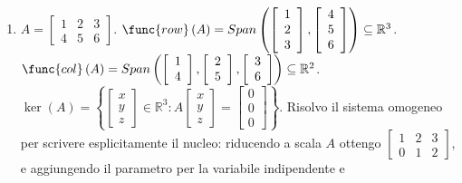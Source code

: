 \documentclass{article}
\begin{document}
\begin{enumerate}
\item $A=\left[ 
\begin{array}{ccc}
1 & 2 & 3 \\ 
4 & 5 & 6%
\end{array}%
\right] $. $\func{row}\left( A\right) =Span\left( \left[ 
\begin{array}{c}
1 \\ 
2 \\ 
3%
\end{array}%
\right] ,\left[ 
\begin{array}{c}
4 \\ 
5 \\ 
6%
\end{array}%
\right] \right) \subseteq 
\mathbb{R}
^{3}$. $\func{col}\left( A\right) =Span\left( \left[ 
\begin{array}{c}
1 \\ 
4%
\end{array}%
\right] ,\left[ 
\begin{array}{c}
2 \\ 
5%
\end{array}%
\right] ,\left[ 
\begin{array}{c}
3 \\ 
6%
\end{array}%
\right] \right) \subseteq 
\mathbb{R}
^{2}$. $\ker \left( A\right) =\left\{ \left[ 
\begin{array}{c}
x \\ 
y \\ 
z%
\end{array}%
\right] \in 
\mathbb{R}
^{3}:A\left[ 
\begin{array}{c}
x \\ 
y \\ 
z%
\end{array}%
\right] =\left[ 
\begin{array}{c}
0 \\ 
0 \\ 
0%
\end{array}%
\right] \right\} $. Risolvo il sistema omogeneo per scrivere esplicitamente
il nucleo: riducendo a scala $A$ ottengo $\left[ 
\begin{array}{ccc}
1 & 2 & 3 \\ 
0 & 1 & 2%
\end{array}%
\right] $, e aggiungendo il parametro per la variabile indipendente e

\end{enumerate}
\end{document}
